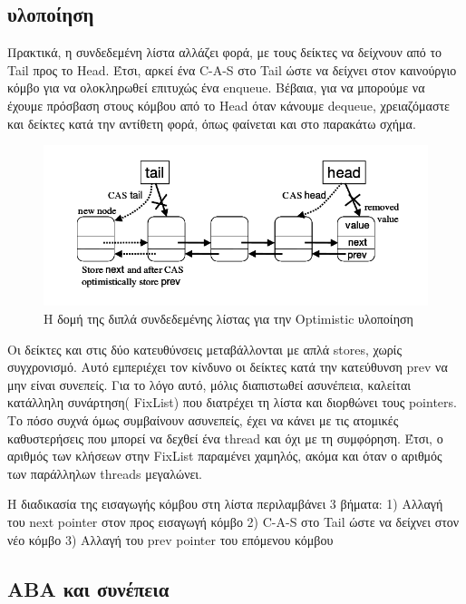 \subsection{υλοποίηση}
Πρακτικά, η συνδεδεμένη λίστα αλλάζει φορά, με τους δείκτες να δείχνουν από το Tail προς το Head. Έτσι, αρκεί ένα C-A-S στο Tail ώστε να δείχνει στον καινούργιο κόμβο για να ολοκληρωθεί επιτυχώς ένα enqueue. Βέβαια, για να μπορούμε να έχουμε πρόσβαση στους κόμβου από το Head όταν κάνουμε dequeue, χρειαζόμαστε και δείκτες κατά την αντίθετη φορά, όπως φαίνεται και στο παρακάτω σχήμα.

\begin{figure}
 \centering
  \includegraphics[scale=0.6]{optimistic_struct.png}
 \caption{ Η δομή της διπλά συνδεδεμένης λίστας για την \textlatin{Optimistic} υλοποίηση}
\end{figure}


Οι δείκτες και στις δύο κατευθύνσεις μεταβάλλονται με απλά \textlatin{stores}, χωρίς συγχρονισμό. Αυτό εμπεριέχει τον κίνδυνο οι δείκτες κατά την κατεύθυνση \textlatin{prev} να μην είναι συνεπείς. Για το λόγο αυτό, μόλις διαπιστωθεί ασυνέπεια, καλείται κατάλληλη συνάρτηση( \textlatin{FixList}) που διατρέχει τη λίστα και διορθώνει τους \textlatin{pointers}. Το πόσο συχνά όμως συμβαίνουν ασυνεπείς, έχει να κάνει με τις ατομικές καθυστερήσεις που μπορεί να δεχθεί ένα \textlatin{thread} και όχι με τη συμφόρηση. Έτσι, ο αριθμός των κλήσεων στην \textlatin{FixList} παραμένει χαμηλός, ακόμα και όταν ο αριθμός των παράλληλων \textlatin{threads} μεγαλώνει.


H διαδικασία της εισαγωγής κόμβου στη λίστα περιλαμβάνει 3 βήματα:
1) Αλλαγή του \textlatin{next pointer} στον προς εισαγωγή κόμβο
2) \textlatin{C-A-S} στο \textlatin{Tail} ώστε να δείχνει στον νέο κόμβο
3) Αλλαγή του \textlatin{prev pointer} του επόμενου κόμβου

\subsection{ΑΒΑ και συνέπεια}

